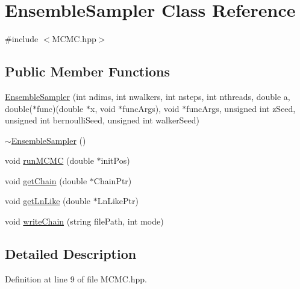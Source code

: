 \hypertarget{class_ensemble_sampler}{\section{Ensemble\-Sampler Class Reference}
\label{class_ensemble_sampler}
}


{\ttfamily \#include $<$M\-C\-M\-C.\-hpp$>$}

\subsection*{Public Member Functions}
\begin{DoxyCompactItemize}
\item 
\hyperlink{class_ensemble_sampler_a2c9b3046553b31fe5b39792404c8431d}{Ensemble\-Sampler} (int ndims, int nwalkers, int nsteps, int nthreads, double a, double($\ast$func)(double $\ast$x, void $\ast$func\-Args), void $\ast$func\-Args, unsigned int z\-Seed, unsigned int bernoulli\-Seed, unsigned int walker\-Seed)
\item 
\hyperlink{class_ensemble_sampler_a3c74a117a85a6230bb48533e88a4cec4}{$\sim$\-Ensemble\-Sampler} ()
\item 
void \hyperlink{class_ensemble_sampler_a7673dd0aeca4848f3c4b3591192b606a}{run\-M\-C\-M\-C} (double $\ast$init\-Pos)
\item 
void \hyperlink{class_ensemble_sampler_a2d77cd48679a151922838dccf1a0c94f}{get\-Chain} (double $\ast$Chain\-Ptr)
\item 
void \hyperlink{class_ensemble_sampler_a008a737b429ec693608968b3b539ddad}{get\-Ln\-Like} (double $\ast$Ln\-Like\-Ptr)
\item 
void \hyperlink{class_ensemble_sampler_a653fe4e94639dd1f09883bb5701d9809}{write\-Chain} (string file\-Path, int mode)
\end{DoxyCompactItemize}


\subsection{Detailed Description}


Definition at line 9 of file M\-C\-M\-C.\-hpp.




